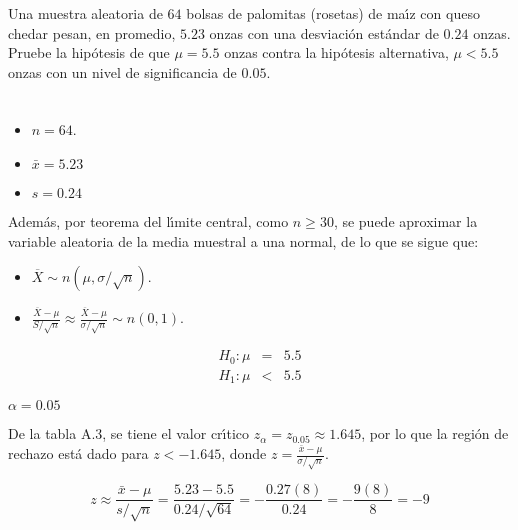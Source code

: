 \begin{enunciado}
 Una muestra aleatoria de $64$ bolsas de palomitas (rosetas) de ma\'{\i}z con queso chedar pesan, en promedio, $5.23$ onzas con una desviaci\'on est\'andar de $0.24$ onzas. Pruebe la hip\'otesis de que $\mu = 5.5$ onzas contra la hip\'otesis alternativa, $\mu < 5.5$ onzas con un nivel de significancia de $0.05$.
\end{enunciado}

\vspace{0.5cm}

\begin{solucion}
 \begin{datos}
  $\phantom{0}$
  \begin{itemize}
   \item $n = 64$.
   \item $\bar{x} = 5.23$
   \item $s = 0.24$
  \end{itemize}
  Adem\'as, por teorema del l\'{\i}mite central, como $n \geq 30$, se puede aproximar la variable aleatoria de la media muestral a una normal, de lo que se sigue que:
  \begin{itemize}
   \item $\overline{X} \sim n\left( \mu, \sigma/\sqrt{n} \right)$.
   \item $\frac{\overline{X}-\mu}{S/\sqrt{n}} \approx \frac{\overline{X}-\mu}{\sigma/\sqrt{n}} \sim n(0,1)$.
  \end{itemize}
 \end{datos}
 
 \begin{hipotesis}
  \begin{eqnarray*}
   H_0: \mu & = & 5.5 \\
   H_1: \mu & < & 5.5
  \end{eqnarray*}
 \end{hipotesis}

 \begin{significancia}
  $\alpha = 0.05$
 \end{significancia}

 \begin{region}
  De la tabla A.3, se tiene el valor cr\'{\i}tico $z_{\alpha} = z_{0.05} \approx 1.645$, por lo que la regi\'on de rechazo est\'a dado para $z < -1.645$, donde $z = \frac{\bar{x} - \mu}{\sigma/\sqrt{n}}$.
 \end{region}

 \begin{estadistico}
  \begin{equation*}
   z \approx \frac{\bar{x} -\mu}{s/\sqrt{n}} = \frac{5.23-5.5}{0.24/\sqrt{64}} = -\frac{0.27(8)}{0.24} = -\frac{9(8)}{8} = -9
  \end{equation*}
 \end{estadistico}


\end{solucion}
